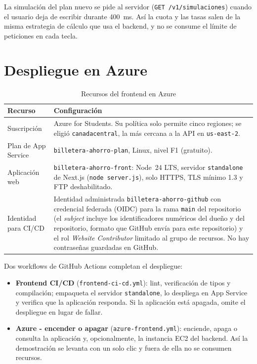 La simulación del plan nuevo se pide al servidor (\texttt{GET /v1/simulaciones}) cuando el usuario deja de escribir durante 400~ms. Así la cuota y las tasas salen de la misma estrategia de cálculo que usa el backend, y no se consume el límite de peticiones en cada tecla.

\section{Despliegue en Azure}

\begin{table}[H]
\centering
\caption{Recursos del frontend en Azure}\label{tab:azure}
\begin{tabularx}{\linewidth}{@{}>{\raggedright}p{3.6cm} X@{}}
\toprule
\textbf{Recurso} & \textbf{Configuración} \\
\midrule
Suscripción & Azure for Students. Su política solo permite cinco regiones; se eligió \texttt{canadacentral}, la más cercana a la API en \texttt{us-east-2}. \\
Plan de App Service & \texttt{billetera-ahorro-plan}, Linux, nivel F1 (gratuito). \\
Aplicación web & \texttt{billetera-ahorro-front}: Node~24 LTS, servidor \texttt{standalone} de Next.js (\texttt{node server.js}), solo HTTPS, TLS mínimo 1.3 y FTP deshabilitado. \\
Identidad para CI/CD & Identidad administrada \texttt{billetera-ahorro-github} con credencial federada (OIDC) para la rama \texttt{main} del repositorio (el \emph{subject} incluye los identificadores numéricos del dueño y del repositorio, formato que GitHub envía para este repositorio) y el rol \emph{Website Contributor} limitado al grupo de recursos. No hay contraseñas guardadas en GitHub. \\
\bottomrule
\end{tabularx}
\end{table}

Dos workflows de GitHub Actions completan el despliegue:

\begin{itemize}
  \item \textbf{Frontend CI/CD} (\texttt{frontend-ci-cd.yml}): lint, verificación de tipos y compilación; empaqueta el servidor \texttt{standalone}, lo despliega en App Service y verifica que la aplicación responda. Si la aplicación está apagada, omite el despliegue en lugar de fallar.
  \item \textbf{Azure - encender o apagar} (\texttt{azure-frontend.yml}): enciende, apaga o consulta la aplicación y, opcionalmente, la instancia EC2 del backend. Así la demostración se levanta con un solo clic y fuera de ella no se consumen recursos.
\end{itemize}

